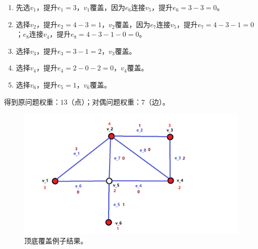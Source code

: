 \begin{enumerate}
    \item 先选$v_1$，提升$e_1 = 3$，$v_1$覆盖，因为$e_6$连接$v_5$，提升$e_6 = 3 - 3 = 0$。
    \item 选择$v_2$，提升$e_2 = 4 - 3 = 1$，$v_2$覆盖，因为$e_7$连接$v_5$，提升$e_7 = 4 - 3 - 1 = 0$；$e_8$连接$v_4$，提升$e_8 =  4 - 3 - 1 - 0 = 0$。
    \item 选择$v_3$，提升$e_3 = 3 - 1 = 2$，$v_3$覆盖。
    \item 选择$v_4$，提升$e_4 = 2 - 0 - 2 = 0$，$v_4$覆盖。
    \item 选择$v_6$，提升$e_5 = 1$，$v_6$覆盖。
\end{enumerate}
得到原问题权重：$13$（点）；对偶问题权重：$7$（边）。
\begin{figure}[H]
    \begin{center}
        \includegraphics[scale=0.5]{img/vertex_cover_result.png}
        \caption{顶底覆盖例子结果。}
    \end{center}
\end{figure}


